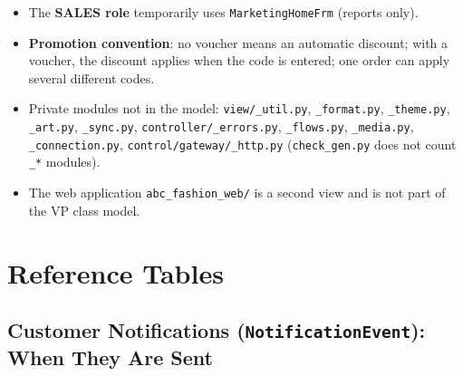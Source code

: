 \begin{itemize}
\item
  The \textbf{SALES role} temporarily uses \texttt{MarketingHomeFrm}
  (reports only).
\item
  \textbf{Promotion convention}: no voucher means an automatic discount;
  with a voucher, the discount applies when the code is entered; one
  order can apply several different codes.
\item
  Private modules not in the model: \texttt{view/\allowbreak{}\_\allowbreak{}util.\allowbreak{}py},
  \texttt{\_\allowbreak{}format.\allowbreak{}py}, \texttt{\_\allowbreak{}theme.\allowbreak{}py}, \texttt{\_\allowbreak{}art.\allowbreak{}py},
  \texttt{\_\allowbreak{}sync.\allowbreak{}py}, \texttt{controller/\allowbreak{}\_\allowbreak{}errors.\allowbreak{}py},
  \texttt{\_\allowbreak{}flows.\allowbreak{}py}, \texttt{\_\allowbreak{}media.\allowbreak{}py}, \texttt{\_\allowbreak{}connection.\allowbreak{}py},
  \texttt{control/\allowbreak{}gateway/\allowbreak{}\_\allowbreak{}http.\allowbreak{}py} (\texttt{check\_\allowbreak{}gen.\allowbreak{}py} does not
  count \texttt{\_\allowbreak{}*} modules).
\item
  The web application \texttt{abc\_\allowbreak{}fashion\_\allowbreak{}web/\allowbreak{}} is a second view and
  is not part of the VP class model.
\end{itemize}

\hypertarget{reference-tables}{%
\section{Reference Tables}\label{reference-tables}}

\hypertarget{customer-notifications-notificationevent-when-they-are-sent}{%
\subsection{\texorpdfstring{Customer Notifications
(\texttt{NotificationEvent}): When They Are
Sent}{Customer Notifications (NotificationEvent): When They Are Sent}}\label{customer-notifications-notificationevent-when-they-are-sent}}


